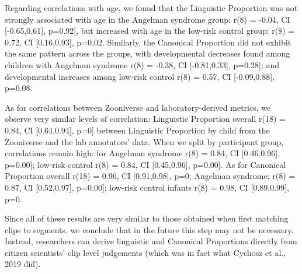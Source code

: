 \documentclass[english,,man,floatsintext]{apa6}
\begin{document}
Regarding correlations with age, we found that the Linguistic Proportion was not strongly associated with age in the Angelman syndrome group: r(8) = -0.04, CI {[}-0.65,0.61{]}, p=0.92{]}, but increased with age in the low-risk control group: r(8) = 0.72, CI {[}0.16,0.93{]}, p=0.02. Similarly, the Canonical Proportion did not exhibit the same pattern across the groups, with developmental decreases found among children with Angelman syndrome r(8) = -0.38, CI {[}-0.81,0.33{]}, p=0.28{]}; and developmental increases among low-risk control r(8) = 0.57, CI {[}-0.09,0.88{]}, p=0.08.

As for correlations between Zooniverse and laboratory-derived metrics, we observe very similar levels of correlation: Linguistic Proportion overall r(18) = 0.84, CI {[}0.64,0.94{]}, p=0{]} between Linguistic Proportion by child from the Zooniverse and the lab annotators' data. When we split by participant group, correlations remain high: for Angelman syndrome r(8) = 0.84, CI {[}0.46,0.96{]}, p=0.00{]}; low-risk control r(8) = 0.84, CI {[}0.45,0.96{]}, p=0.00{]}. As for Canonical Proportion overall r(18) = 0.96, CI {[}0.91,0.98{]}, p=0; Angelman syndrome: r(8) = 0.87, CI {[}0.52,0.97{]}, p=0.00{]}; low-risk control infants r(8) = 0.98, CI {[}0.89,0.99{]}, p=0.

Since all of these results are very similar to those obtained when first matching clips to segments, we conclude that in the future this step may not be necessary. Instead, researchers can derive linguistic and Canonical Proportions directly from citizen scientists' clip level judgements (which was in fact what Cychosz et al., 2019 did).
\end{document}
